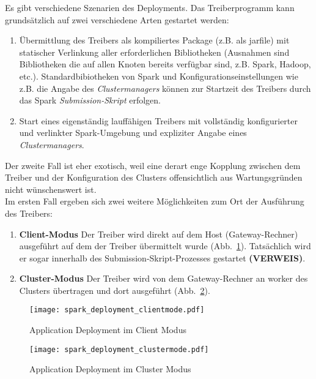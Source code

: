 Es gibt verschiedene Szenarien des Deployments. Das Treiberprogramm kann grundsätzlich auf zwei verschiedene Arten gestartet werden:\\

\begin{enumerate}
	\item Übermittlung des Treibers als kompiliertes Package (z.B. als \gls{jarfile}) mit statischer Verlinkung aller erforderlichen Bibliotheken (Ausnahmen sind Bibliotheken die auf allen Knoten bereits verfügbar sind, z.B. Spark, Hadoop, etc.). Standardbibiotheken von Spark und Konfigurationseinstellungen wie z.B. die Angabe des \textit{Clustermanagers} können zur Startzeit des Treibers durch das Spark \textit{Submission-Skript} erfolgen.
	\item Start eines eigenständig lauffähigen Treibers mit vollständig konfigurierter und verlinkter Spark-Umgebung und expliziter Angabe eines \textit{Clustermanagers}.
\end{enumerate}

Der zweite Fall ist eher exotisch, weil eine derart enge Kopplung zwischen dem Treiber und der Konfiguration des Clusters offensichtlich aus Wartungsgründen nicht wünschenswert ist.\\

Im ersten Fall ergeben sich zwei weitere Möglichkeiten zum Ort der Ausführung des Treibers:\\

\begin{enumerate}
	\item \textbf{Client-Modus}	Der Treiber wird direkt auf dem Host (Gateway-Rechner) ausgeführt auf dem der Treiber übermittelt wurde (Abb.~\ref{fig:spark_deployment_clientmode}). Tatsächlich wird er sogar innerhalb des Submission-Skript-Prozesses gestartet \textbf{(VERWEIS)}.
	\item \textbf{Cluster-Modus}	Der Treiber wird von dem Gateway-Rechner an \gls{worker} des Clusters übertragen und dort ausgeführt (Abb.~\ref{fig:spark_deployment_clustermode}).
\end{enumerate}

\begin{figure}[ht!]
	\centering
  \texttt{[image: spark\_deployment\_clientmode.pdf]}
	\caption{Application Deployment im Client Modus}
	\label{fig:spark_deployment_clientmode}
\end{figure}

\begin{figure}[ht!]
	\centering
  \texttt{[image: spark\_deployment\_clustermode.pdf]}
	\caption{Application Deployment im Cluster Modus}
	\label{fig:spark_deployment_clustermode}
\end{figure}


